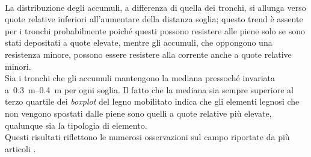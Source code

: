 %
\\
La distribuzione degli accumuli, a differenza di quella dei tronchi, si allunga verso quote relative inferiori all'aumentare della distanza soglia; questo trend è assente per i tronchi probabilmente poiché questi possono resistere alle piene solo se sono stati depositati a quote elevate, mentre gli accumuli, che oppongono una resistenza minore, possono essere resistere alla corrente anche a quote relative minori.
\\
Sia i tronchi che gli accumuli mantengono la mediana pressoché invariata a~\SIrange[range-phrase = {-}, range-units = single]{0.3}{0.4}{\m} per ogni soglia.
Il fatto che la mediana sia sempre superiore al terzo quartile dei \emph{boxplot} del legno mobilitato indica che gli elementi legnosi che non vengono spostati dalle piene sono quelli a quote relative più elevate, qualunque sia la tipologia di elemento.
\\
Questi risultati riflettono le numerosi osservazioni sul campo riportate da più articoli .

